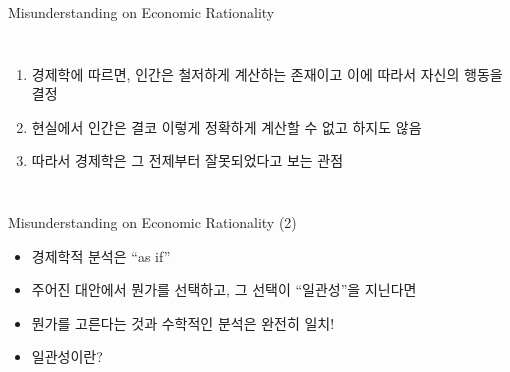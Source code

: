 \documentclass[final]{beamer}
\begin{document}

\begin{frame}[t]{Misunderstanding on Economic Rationality}
	\begin{columns}[c]
	\column{18em}
	\begin{enumerate}
		\item 경제학에 따르면, 인간은 철저하게 계산하는 존재이고 이에 따라서 자신의 행동을 결정
		\item 현실에서 인간은 결코 이렇게 정확하게 계산할 수 없고 하지도 않음
		\item 따라서 경제학은 그 전제부터 잘못되었다고 보는 관점
	\end{enumerate}
	\column{12em}
	\end{columns}
\end{frame}

\begin{frame}[t]{Misunderstanding on Economic Rationality (2)}
	\begin{itemize}
		\item 경제학적 분석은 ``as if'' 
		\item 주어진 대안에서 뭔가를 선택하고, 그 선택이 ``일관성''을 지닌다면 
		\item 뭔가를 고른다는 것과 수학적인 분석은 완전히 일치!
		\item 일관성이란?\\[1em]
	\end{itemize}
\end{frame}
\end{document}
